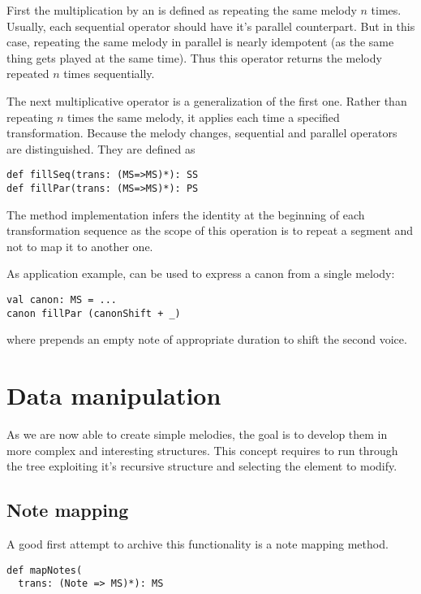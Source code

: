 \documentclass[twocolumn, 11pt]{article}
\begin{document}
First the multiplication by an  is defined as repeating the same melody $n$ times. Usually, each sequential operator should have it's parallel counterpart. But in this case, repeating the same melody in parallel is nearly idempotent (as the same thing gets played at the same time). Thus this operator returns the melody repeated $n$ times sequentially.

The next multiplicative operator is a generalization of the first one. Rather than repeating $n$ times the same melody, it applies each time a specified transformation. Because the melody changes, sequential and parallel operators are distinguished. They are defined as
\begin{lstlisting}
def fillSeq(trans: (MS=>MS)*): SS
def fillPar(trans: (MS=>MS)*): PS
\end{lstlisting}
The method implementation infers the identity at the beginning of each transformation sequence as the scope of this operation is to repeat a segment and not to map it to another one.

As application example,  can be used to express a canon from a single melody:
\begin{lstlisting}
val canon: MS = ...
canon fillPar (canonShift + _)
\end{lstlisting}
where  prepends an empty note of appropriate duration to shift the second voice.

\section{Data manipulation}

As we are now able to create simple melodies, the goal is to develop them in more complex and interesting structures.
This concept requires to run through the tree exploiting it's recursive structure and selecting the element to modify.



\subsection{Note mapping}

A good first attempt to archive this functionality is a note mapping method. 

\begin{lstlisting}
def mapNotes(
  trans: (Note => MS)*): MS
\end{lstlisting}
\end{document}
